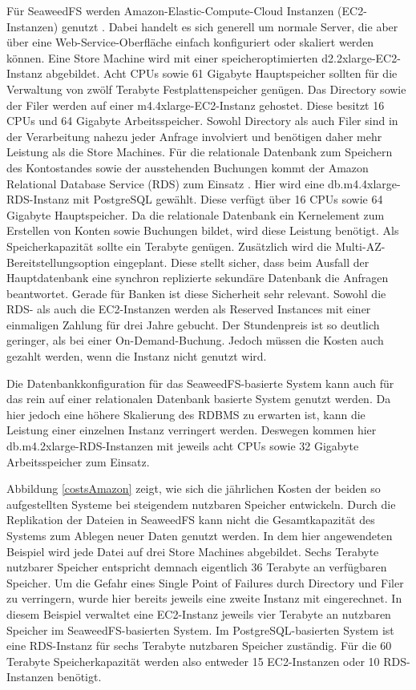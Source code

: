 \documentclass[12pt,oneside,a4paper,parskip]{scrbook}
\begin{document}
Für SeaweedFS werden Amazon-Elastic-Compute-Cloud Instanzen (EC2-Instanzen) genutzt \cite{EC2}. Dabei handelt es sich generell um normale Server, die aber über eine Web-Service-Oberfläche einfach konfiguriert oder skaliert werden können. Eine Store Machine wird mit einer speicheroptimierten d2.2xlarge-EC2-Instanz abgebildet. Acht CPUs sowie 61 Gigabyte Hauptspeicher sollten für die Verwaltung von zwölf Terabyte Festplattenspeicher genügen. Das Directory sowie der Filer werden auf einer m4.4xlarge-EC2-Instanz gehostet. Diese besitzt 16 CPUs und 64 Gigabyte Arbeitsspeicher. Sowohl Directory als auch Filer sind in der Verarbeitung nahezu jeder Anfrage involviert und benötigen daher mehr Leistung als die Store Machines. Für die relationale Datenbank zum Speichern des Kontostandes sowie der ausstehenden Buchungen kommt der Amazon Relational Database Service (RDS) zum Einsatz \cite{RDS}. Hier wird eine db.m4.4xlarge-RDS-Instanz mit PostgreSQL gewählt. Diese verfügt über 16 CPUs sowie 64 Gigabyte Hauptspeicher. Da die relationale Datenbank ein Kernelement zum Erstellen von Konten sowie Buchungen bildet, wird diese Leistung benötigt. Als Speicherkapazität sollte ein Terabyte genügen. Zusätzlich wird die Multi-AZ-Bereitstellungsoption eingeplant. Diese stellt sicher, dass beim Ausfall der Hauptdatenbank eine synchron replizierte sekundäre Datenbank die Anfragen beantwortet. Gerade für Banken ist diese Sicherheit sehr relevant.
Sowohl die RDS- als auch die EC2-Instanzen werden als Reserved Instances mit einer einmaligen Zahlung für drei Jahre gebucht. Der Stundenpreis ist so deutlich geringer, als bei einer On-Demand-Buchung. Jedoch müssen die Kosten auch gezahlt werden, wenn die Instanz nicht genutzt wird.

Die Datenbankkonfiguration für das SeaweedFS-basierte System kann auch für das rein auf einer relationalen Datenbank basierte System genutzt werden. Da hier jedoch eine höhere Skalierung des RDBMS zu erwarten ist, kann die Leistung einer einzelnen Instanz verringert werden. Deswegen kommen hier db.m4.2xlarge-RDS-Instanzen mit jeweils acht CPUs sowie 32 Gigabyte Arbeitsspeicher zum Einsatz. 


Abbildung \ref{costsAmazon} zeigt, wie sich die jährlichen Kosten der beiden so aufgestellten Systeme bei steigendem nutzbaren Speicher entwickeln. Durch die Replikation der Dateien in SeaweedFS kann nicht die Gesamtkapazität des Systems zum Ablegen neuer Daten genutzt werden. In dem hier angewendeten Beispiel wird jede Datei auf drei Store Machines abgebildet. Sechs Terabyte nutzbarer Speicher entspricht demnach eigentlich 36 Terabyte an verfügbaren Speicher. Um die Gefahr eines Single Point of Failures durch Directory und Filer zu verringern, wurde hier bereits jeweils eine zweite Instanz mit eingerechnet. In diesem Beispiel verwaltet eine EC2-Instanz jeweils vier Terabyte an nutzbaren Speicher im SeaweedFS-basierten System. Im PostgreSQL-basierten System ist eine RDS-Instanz für sechs Terabyte nutzbaren Speicher zuständig. Für die 60 Terabyte Speicherkapazität werden also entweder 15 EC2-Instanzen oder 10 RDS-Instanzen benötigt. 
\end{document}
